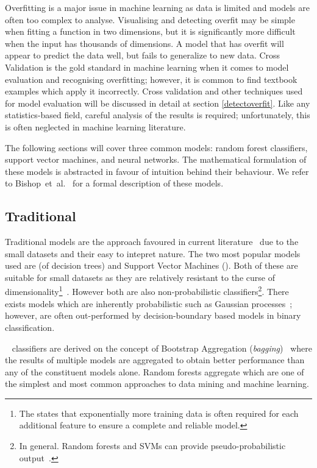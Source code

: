 \documentclass[12pt, twoside]{book}
\renewcommand\emph[1]{\textit{\color{USred}{#1}}}
\begin{document}
Overfitting is a major issue in machine learning as data is limited and models are often too complex to analyse. Visualising and detecting overfit may be simple when fitting a function in two dimensions, but it is significantly more difficult when the input has thousands of dimensions. A model that has overfit will appear to predict the data well, but fails to generalize to new data. Cross Validation is the gold standard in machine learning when it comes to model evaluation and recognising overfitting; however, it is common to find textbook examples which apply it incorrectly. Cross validation and other techniques used for model evaluation will be discussed in detail at section \ref{detectoverfit}. Like any statistics-based field, careful analysis of the results is required; unfortunately, this is often neglected in machine learning literature.


The following sections will cover three common models: random forest classifiers, support vector machines, and neural networks. The mathematical formulation of these models is abstracted in favour of intuition behind their behaviour. We refer to Bishop~et~al.~\cite{prml} for a formal description of these models.

 
\subsection{Traditional}
\label{traditionalmodels}
Traditional models are the approach favoured in current literature~\cite{review2013} due to the small datasets and their easy to intepret nature. The two most popular models used are \emph{Random Forests} (of decision trees) and Support Vector Machines (\emph{SVM}). Both of these are suitable for small datasets as they are relatively resistant to the curse of dimensionality\footnote{The \emph{curse of dimensionality} states that  exponentially more training data is often required for each additional feature to ensure a complete and reliable model.}~\cite{curseofdimensionality}. However both are also non-probabilistic classifiers\footnote{In general. Random forests and SVMs can provide pseudo-probabilistic output~\cite{svmprobabilistic}.}. There exists models which are inherently probabilistic such as Gaussian processes~\cite{rasmussen2006gaussian}; however, are often out-performed by decision-boundary based models in binary classification.

\emph{Random Forest}~\cite{randomforests} classifiers are derived on the concept of Bootstrap Aggregation  (\textit{bagging})~\cite{bagging} where the results of multiple models are aggregated to obtain better performance than any of the constituent models alone. Random forests aggregate \emph{Decision Trees} which are one of the simplest and most common approaches to data mining and machine learning. 
\end{document}
